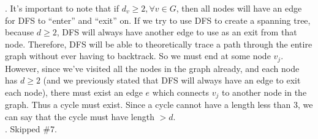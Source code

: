 \documentclass[12pt]{report}
\newcommand{\no}{\noindent}
\begin{document}
	\no 6. It's important to note that if $d_v \geq 2, \forall v \in G$, then all nodes will have an edge for DFS to ``enter'' and ``exit'' on. If we try to use DFS to create a spanning tree, because $d \geq 2$, DFS will always have another edge to use as an exit from that node. Therefore, DFS will be able to theoretically trace a path through the entire graph without ever having to backtrack. So we must end at some node $v_j$. However, since we've visited all the nodes in the graph already, and each node has $d \geq 2$ (and we previously stated that DFS will always have an edge to exit each node), there must exist an edge $e$ which connects $v_j$ to another node in the graph. Thus a cycle must exist. Since a cycle cannot have a length less than 3, we can say that the cycle must have length $> d$.\\

	\no 7. Skipped \#7.\\
\end{document}
